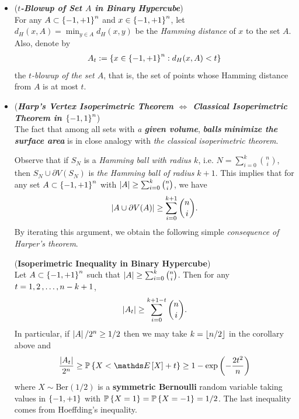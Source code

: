 \documentclass[11pt]{article}
\begin{document}
\begin{itemize}
\item \begin{definition} (\textbf{\emph{$t$-Blowup of Set $A$ in Binary Hypercube}}) \\
For any $A \subset \left\{-1, +1\right\}^n$ and $x \in \left\{-1, +1\right\}^n$, let $d_{H}(x, A) = \min_{y \in A} d_{H}(x, y)$ be the \emph{Hamming distance} of $x$ to the set $A$. Also, denote by
\begin{align*}
A_t := \left\{x \in \left\{-1, +1\right\}^n: d_{H}(x, A) < t\right\}
\end{align*} the \emph{$t$-blowup of the set $A$}, that is, the set of points whose Hamming distance from $A$ is at most $t$.
\end{definition}

\item \begin{remark} (\textbf{\emph{Harp's Vertex Isoperimetric Theorem $\Leftrightarrow$ Classical Isoperimetric Theorem in $\left\{-1, 1\right\}^n$}}) \\
The fact that among all sets with \emph{a \textbf{given volume}}, \emph{\textbf{balls}} \emph{\textbf{minimize the surface area}} is in close analogy with \emph{the classical isoperimetric theorem}. 

Observe that if $S_N$ is a \emph{Hamming ball with radius $k$}, i.e. $N = \sum_{i=0}^{k}{n \choose i}$, then $S_N \cup \partial V(S_N)$ is \emph{the Hamming ball of radius} $k + 1$. This implies that for any set $A \subset \left\{-1, +1\right\}^n$ with $\left\lvert A \right\rvert \ge \sum_{i=0}^{k}{n \choose i}$, we have
\begin{align*}
\left\lvert A \cup \partial V(A) \right\rvert \ge  \sum_{i=0}^{k+1}{n \choose i}. 
\end{align*}
By iterating this argument, we obtain the following simple \emph{consequence of Harper's theorem}. 
\end{remark}

\begin{corollary} (\textbf{Isoperimetric Inequality in Binary Hypercube}) \citep{boucheron2013concentration}\\ 
Let $A \subset \left\{-1, +1\right\}^n$ such that $\left\lvert A \right\rvert \ge \sum_{i=0}^{k}{n \choose i}$. Then for any $t=1, 2 \,{,}\ldots{,}\, n-k+1$, 
\begin{align}
\left\lvert A_t \right\rvert \ge  \sum_{i=0}^{k+1 - t}{n \choose i}. \label{ineqn: harp_vertex_isoperimetric_inequality}
\end{align} In particular, if $\left\lvert A \right\rvert/2^n \ge 1/2$ then we may take $k = \left\lfloor n/2 \right\rfloor$ in the corollary above and
\begin{align}
\frac{\abs{A_t}}{2^n} \ge \bP\set{X  < \E{}{X} + t } \ge 1 - \exp\paren{- \frac{2t^2}{n}}
\end{align} where $X \sim \text{Ber}(1/2)$ is a \textbf{symmetric Bernoulli} random variable taking values in $\left\{-1, +1\right\}$ with ${\mathbb P}\left\{X= 1\right\} = {\mathbb P}\left\{X = -1\right\} = 1/2$. The last inequality comes from Hoeffding's inequality.
\end{corollary}


\end{itemize}
\end{document}
